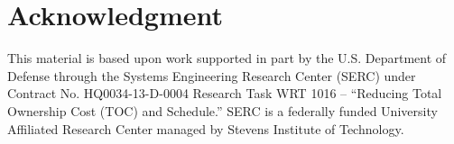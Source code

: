 \section*{Acknowledgment}
\label{sec:acknowledgment}
This material is based upon work supported in part by the U.S. Department of Defense through the Systems Engineering Research Center (SERC) under Contract No. HQ0034-13-D-0004 Research Task WRT 1016 -- ``Reducing Total Ownership Cost (TOC) and Schedule.'' SERC is a federally funded University Affiliated Research Center managed by Stevens Institute of Technology. 
